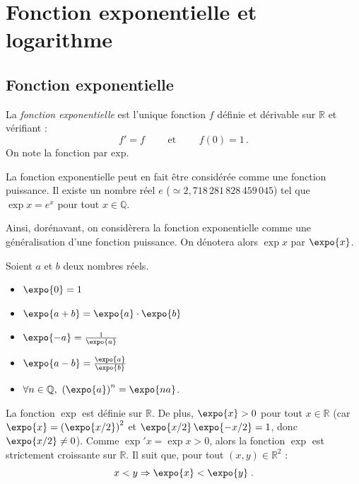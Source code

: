 
\TCDLessonStyleOn
\chapter{Fonction exponentielle et logarithme}
\section{Fonction exponentielle}
      \begin{defi}
            La \emph{fonction exponentielle} est l'unique fonction $f$ d\'efinie et d\'erivable sur $\mathbb{R}$ et v\'erifiant : 
                  \[   f' = f \qquad \text{ et } \qquad f(0) = 1   \,. \]
            On note la fonction par $\mathrm{exp}$.
      \end{defi}
      \begin{prop}
            La fonction exponentielle peut en fait \^etre consid\'er\'ee comme une fonction puissance.
            Il existe un nombre r\'eel $e$ ($\simeq 2,718\,281\,828\,459\,045$) 
            tel que $\exp{x} = e^{x}$ pour tout $x\in\mathbb{Q}$.
            
            Ainsi, dor\'enavant, on consid\`erera la fonction exponentielle comme 
            une g\'en\'eralisation d'une fonction puissance.
            On d\'enotera alors $\exp{x}$ par $\expo{x}$.
      \end{prop}
      \begin{thm}
            Soient $a$ et $b$ deux nombres r\'eels.
            \begin{itemize}
                  \item $\expo{0} = 1$
                  \item $\expo{a+b} = \expo{a} \cdot \expo{b}$
                  \item $\expo{-a} = \frac{1}{\expo{a}}$
                  \item $\expo{a-b} = \frac{\expo{a}}{\expo{b}}$
                  \item $\forall n \in \mathbb{Q},\ \left(\expo{a}\right)^n = \expo{na}$.
            \end{itemize}
      \end{thm}
      \begin{prop}
            La fonction $\exp$ est d\'efinie sur $\mathbb{R}$.
            De plus, $\expo{x} > 0$ pour tout $x\in\mathbb{R}$ (car $\expo{x} = \left(\expo{x/2}\right)^2$ et $\expo{x/2}\,\expo{-x/2} = 1$, donc $\expo{x/2} \neq 0$).
            Comme $\exp' x = \exp x > 0$, alors la fonction $\exp$ est strictement croissante sur $\mathbb{R}$.
            Il suit que, pour tout $(x,y)\in\mathbb{R}^2$ :
                  \[
                        x<y \Rightarrow \expo{x} < \expo{y}      \;.
                  \]
      \end{prop}
